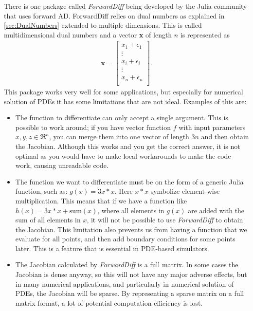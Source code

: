 There is one package called \textit{ForwardDiff} \citep{ForwardDiff} being developed by the Julia community that uses forward AD. ForwardDiff relies on dual numbers as explained in \autoref{sec:DualNumbers} extended to multiple dimensions. This is called multidimensional dual numbers and a vector \textbf{x} of length $n$ is represented as
\begin{align*}
    \textbf{x} = \begin{bmatrix}
    x_1 + \epsilon_1 \\
    \vdots \\
    x_i + \epsilon_i \\
    \vdots \\
    x_n + \epsilon_n \\
    \end{bmatrix}.
\end{align*}
 This package works very well for some applications, but especially for numerical solution of PDEs it has some limitations that are not ideal. Examples of this are: 
\begin{itemize}
    \item The function to differentiate can only accept a single argument. This is possible to work around; if you have vector function $f$ with input parameters $x,y,z \in \Re^n$, you can merge them into one vector of length $3n$ and then obtain the Jacobian. Although this works and you get the correct answer, it is not optimal as you would have to make local workarounds to make the code work, causing unreadable code.
    \item The function we want to differentiate must be on the form of a generic Julia function, such as: $g(x) = 3x*x$. Here $x*x$ symbolize element-wise multiplication. This means that if we have a function like $h(x) = 3x*x + \text{sum}(x)$, where all elements in $g(x)$ are added with the sum of all elements in $x$, it will not be possible to use \textit{ForwardDiff} to obtain the Jacobian. This limitation also prevents us from having a function that we evaluate for all points, and then add boundary conditions for some points later. This is a feature that is essential in PDE-based simulators.
    \item The Jacobian calculated by \textit{ForwardDiff} is a full matrix. In some cases the Jacobian is dense anyway, so this will not have any major adverse effects, but in many numerical applications, and particularly in numerical solution of PDEs, the Jacobian will be sparse. By representing a sparse matrix on a full matrix format, a lot of potential computation efficiency is lost.
\end{itemize}


